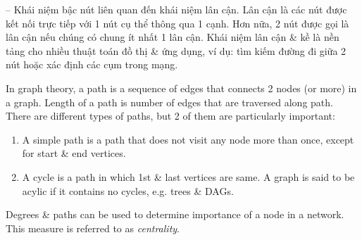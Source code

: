 \documentclass{article}
\begin{document}
\begin{itemize}
\begin{itemize}
\begin{itemize}
            -- Khái niệm bậc nút liên quan đến khái niệm lân cận. Lân cận là các nút được kết nối trực tiếp với 1 nút cụ thể thông qua 1 cạnh. Hơn nữa, 2 nút được gọi là lân cận nếu chúng có chung ít nhất 1 lân cận. Khái niệm lân cận \& kề là nền tảng cho nhiều thuật toán đồ thị \& ứng dụng, ví dụ: tìm kiếm đường đi giữa 2 nút hoặc xác định các cụm trong mạng.

            In graph theory, a path is a sequence of edges that connects 2 nodes (or more) in a graph. Length of a path is number of edges that are traversed along path. There are different types of paths, but 2 of them are particularly important:
            \begin{enumerate}
                \item A simple path is a path that does not visit any node more than once, except for start \& end vertices.
                \item A cycle is a path in which 1st \& last vertices are same. A graph is said to be acylic if it contains no cycles, e.g. trees \& DAGs.
            \end{enumerate}
            Degrees \& paths can be used to determine importance of a node in a network. This measure is referred to as {\it centrality}.


\end{itemize}
\end{itemize}
\end{itemize}
\end{document}
